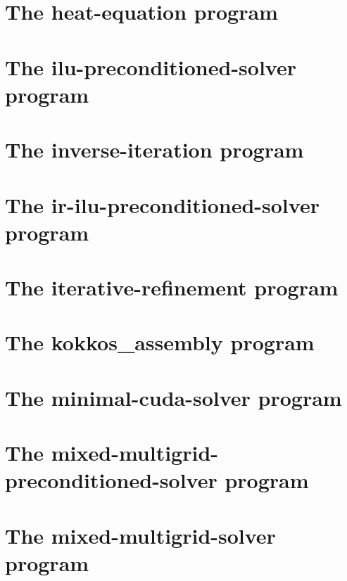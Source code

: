 \let\mypdfximage\pdfximage\def\pdfximage{\immediate\mypdfximage}\documentclass[twoside]{book}
\newcommand{\+}{\discretionary{\mbox{\scriptsize$\hookleftarrow$}}{}{}}
\begin{document}
\chapter{The heat-\/equation program}
\label{heat_equation}

\chapter{The ilu-\/preconditioned-\/solver program}
\label{ilu_preconditioned_solver}

\chapter{The inverse-\/iteration program}
\label{inverse_iteration}

\chapter{The ir-\/ilu-\/preconditioned-\/solver program}
\label{ir_ilu_preconditioned_solver}

\chapter{The iterative-\/refinement program}
\label{iterative_refinement}

\chapter{The kokkos\+\_\+assembly program}
\label{kokkos_assembly}

\chapter{The minimal-\/cuda-\/solver program}
\label{minimal_cuda_solver}

\chapter{The mixed-\/multigrid-\/preconditioned-\/solver program}
\label{mixed_multigrid_preconditioned_solver}

\chapter{The mixed-\/multigrid-\/solver program}
\label{mixed_multigrid_solver}

\end{document}
